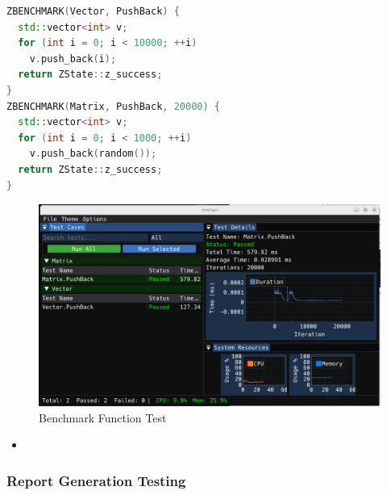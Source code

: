 \documentclass{article}
\begin{document}
\begin{framed}

    \begin{lstlisting}[language=C++]
ZBENCHMARK(Vector, PushBack) {
  std::vector<int> v;
  for (int i = 0; i < 10000; ++i)
    v.push_back(i);
  return ZState::z_success;
}
ZBENCHMARK(Matrix, PushBack, 20000) {
  std::vector<int> v;
  for (int i = 0; i < 1000; ++i)
    v.push_back(random());
  return ZState::z_success;
}\end{lstlisting}
\end{framed}
\begin{figure}[H]
    \centering
    \includegraphics[width=\textwidth]{img/ben.png}
    \caption{Benchmark Function Test}
    \label{fig: Benchmark Function Test}
\end{figure}

\begin{itemize}
    \item
\end{itemize}
\subsubsection{Report Generation Testing}
\end{document}
